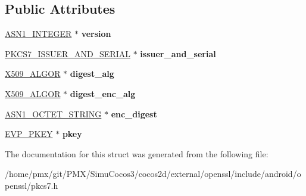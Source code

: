 \subsection*{Public Attributes}
\begin{DoxyCompactItemize}
\item 
\mbox{\label{structpkcs7__signer__info__st_ad92384d594f389c2d22f58e42baec9d6}} 
\hyperlink{structasn1__string__st}{A\+S\+N1\+\_\+\+I\+N\+T\+E\+G\+ER} $\ast$ {\bfseries version}
\item 
\mbox{\label{structpkcs7__signer__info__st_a962cc6e91f40c88f84eea8387532070e}} 
\hyperlink{structpkcs7__issuer__and__serial__st}{P\+K\+C\+S7\+\_\+\+I\+S\+S\+U\+E\+R\+\_\+\+A\+N\+D\+\_\+\+S\+E\+R\+I\+AL} $\ast$ {\bfseries issuer\+\_\+and\+\_\+serial}
\item 
\mbox{\label{structpkcs7__signer__info__st_acbecced3f621762e75e6ac8d55b1faaa}} 
\hyperlink{structX509__algor__st}{X509\+\_\+\+A\+L\+G\+OR} $\ast$ {\bfseries digest\+\_\+alg}
\item 
\mbox{\label{structpkcs7__signer__info__st_aace64079c449969b1a49e4128f7ad339}} 
\hyperlink{structX509__algor__st}{X509\+\_\+\+A\+L\+G\+OR} $\ast$ {\bfseries digest\+\_\+enc\+\_\+alg}
\item 
\mbox{\label{structpkcs7__signer__info__st_a9bd523e2dd4fff4aee03503ed31bbc8e}} 
\hyperlink{structasn1__string__st}{A\+S\+N1\+\_\+\+O\+C\+T\+E\+T\+\_\+\+S\+T\+R\+I\+NG} $\ast$ {\bfseries enc\+\_\+digest}
\item 
\mbox{\label{structpkcs7__signer__info__st_a7412145d632f5063aafa9af544e0d283}} 
\hyperlink{structevp__pkey__st}{E\+V\+P\+\_\+\+P\+K\+EY} $\ast$ {\bfseries pkey}
\end{DoxyCompactItemize}


The documentation for this struct was generated from the following file\+:\begin{DoxyCompactItemize}
\item 
/home/pmx/git/\+P\+M\+X/\+Simu\+Cocos3/cocos2d/external/openssl/include/android/openssl/pkcs7.\+h\end{DoxyCompactItemize}

